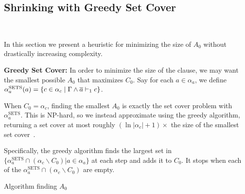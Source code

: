 
\subsection{Shrinking with Greedy Set Cover}~\label{subsec:sym}

In this section we present a heuristic for minimizing the size of $A_0$ without drastically increasing complexity.


\noindent \textbf{Greedy Set Cover:} %
In order to minimize the size of the clause, we may want the smallest possible $A_0$ that maximizes $C_0$. Say for each $a \in \alpha_a$, we define $\alpha_a^\mathrm{SETS}(a) = \{ c \in \alpha_c \; | \; \Gamma \land \overline{a} \vdash_1 c\}$. 

When $C_0 = \alpha_c$, finding the smallest $A_0$ is exactly the set cover problem with $\alpha_a^\mathrm{SETS}$. This is NP-hard, so we instead approximate using the greedy algorithm, returning a set cover at most roughly $(\ln |\alpha_c| + 1)\times$ the size of the smallest set cover~\cite{greedysetcover}. 


Specifically, the greedy algorithm finds the largest set in $\{\alpha_a^\mathrm{SETS} \cap (\alpha_c \backslash C_0) | a \in \alpha_a \}$ at each step and adds it to $C_0$. It stops when each of the $\alpha_a^\mathrm{SETS} \cap (\alpha_c \backslash C_0)$ are empty.


\begin{algorithm}
    \caption{Algorithm finding $A_0$}\label{alg:finda0}
    \SetAlgoNoLine
\end{algorithm}

